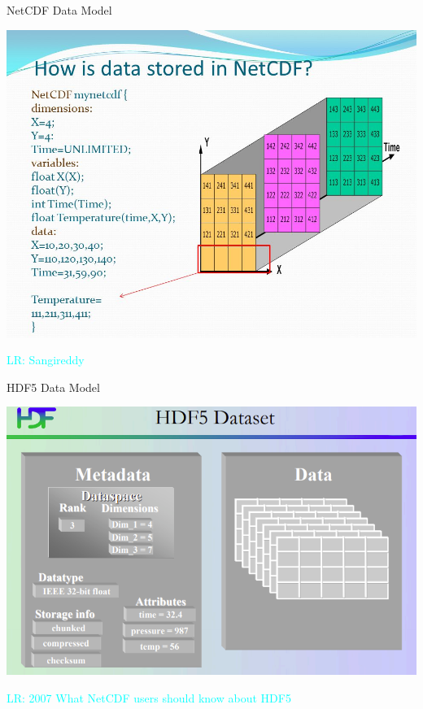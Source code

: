 \documentclass[compress,11pt,xcolor=svgnames,aspectratio=169]{beamer}
\newcommand{\lr}[1]{\textcolor{cyan}{LR: #1}}
\begin{document}
\begin{frame}[t]{NetCDF Data Model}

\begin{center}
\includegraphics[scale=0.32]{fig/netcdf-data}
\end{center}

\lr{Sangireddy}

\end{frame}

\begin{frame}[t]{HDF5 Data Model}

\begin{center}
\includegraphics[scale=0.5]{fig/hdf5-data}
\end{center}

\lr{2007 What NetCDF users should know about HDF5}

\end{frame}
\end{document}

